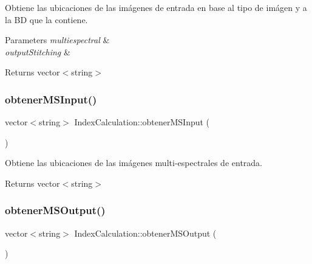 Obtiene las ubicaciones de las imágenes de entrada en base al tipo de imágen y a la BD que la contiene. 


\begin{DoxyParams}{Parameters}
{\em multiespectral} & \\
\hline
{\em output\+Stitching} & \\
\hline
\end{DoxyParams}
\begin{DoxyReturn}{Returns}
vector$<$string$>$ 
\end{DoxyReturn}
\mbox{\label{classIndexCalculation_a889a95c13bc480c1194016ca0e1e9559}} 
\subsubsection{\texorpdfstring{obtener\+M\+S\+Input()}{obtenerMSInput()}}
{\footnotesize\ttfamily vector$<$string$>$ Index\+Calculation\+::obtener\+M\+S\+Input (\begin{DoxyParamCaption}{ }\end{DoxyParamCaption})\hspace{0.3cm}{\ttfamily [inline]}}



Obtiene las ubicaciones de las imágenes multi-\/espectrales de entrada. 

\begin{DoxyReturn}{Returns}
vector$<$string$>$ 
\end{DoxyReturn}
\mbox{\label{classIndexCalculation_a43b986cd58175d47714a399e7fdfd7e3}} 
\subsubsection{\texorpdfstring{obtener\+M\+S\+Output()}{obtenerMSOutput()}}
{\footnotesize\ttfamily vector$<$string$>$ Index\+Calculation\+::obtener\+M\+S\+Output (\begin{DoxyParamCaption}{ }\end{DoxyParamCaption})\hspace{0.3cm}{\ttfamily [inline]}}



